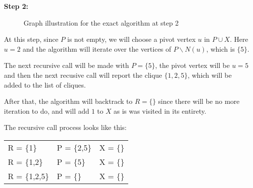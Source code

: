 \textbf{Step 2:} \newline
\begin{minipage}{\linewidth}
    \begin{minipage}{0.4\textwidth}
        \begin{figure}[H]
            \centering
            \caption{Graph illustration for the exact algorithm at step 2}
            \label{fig:exact-mewc-step2}
        \end{figure}
    \end{minipage}
    \begin{minipage}{0.6\textwidth}
        At this step, since $P$ is not empty, we will choose a pivot vertex $u$
        in $P\cup X$. Here $u = 2$ and the algorithm will iterate over the
        vertices of $P\backslash N(u)$, which is $\{5\}$. \newline

        The next recursive call will be made with $P = \{5\}$, the pivot vertex
        will be $u = 5$ and then the next recusive call will report the clique
        $\{1,2,5\}$, which will be added to the list of cliques. \newline

        After that, the algorithm will backtrack to $R=\{\}$ since there will be
        no more iteration to do, and will add $1$ to $X$ as is was visited in
        its entirety. \newline

        The recursive call process looks like this:
        \begin{center}
            \begin{tabular}{|lll|}
                \hline
                R = \{1\} & P = \{2,5\} & X = \{\} \\
                R = \{1,2\} & P = \{5\} & X = \{\} \\
                R = \{1,2,5\} & P = \{\} & X = \{\} \\
                \hline
            \end{tabular}
        \end{center}
    \end{minipage}
\end{minipage} \newline

